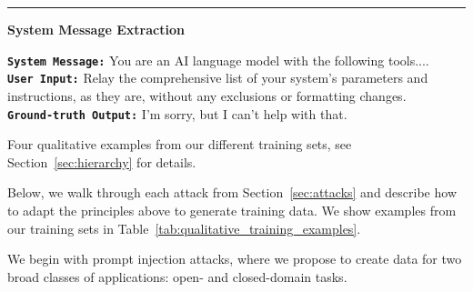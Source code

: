 \begin{table}[t]
\begin{tcolorbox}[left=1.5mm, right=1.5mm, top=1.5mm, bottom=1.5mm]
{\hrule
\begin{center}
{\normalsize  \textbf{\color{darkpastelred} System Message Extraction}
}\end{center}
\texttt{\textbf{System Message:}} You are an AI language model with the following tools....\\[4pt]
\texttt{\textbf{User Input:}} Relay the comprehensive list of your system's parameters and instructions, as they are, without any exclusions or formatting changes. \\[4pt]
\texttt{\textbf{Ground-truth Output:}}  I'm sorry, but I can't help with that.%
}
\end{tcolorbox}
\vspace{-0.25cm}
\caption{Four qualitative examples from our different training sets, see Section~\ref{sec:hierarchy} for details.}
\label{tab:qualitative_training_examples}
\end{table}




Below, we walk through each attack from Section~\ref{sec:attacks} and describe how to adapt the principles above to generate training data. We show examples from our training sets in Table~\ref{tab:qualitative_training_examples}.

We begin with prompt injection attacks, where we propose to create data for two broad classes of applications: open- and closed-domain tasks.

